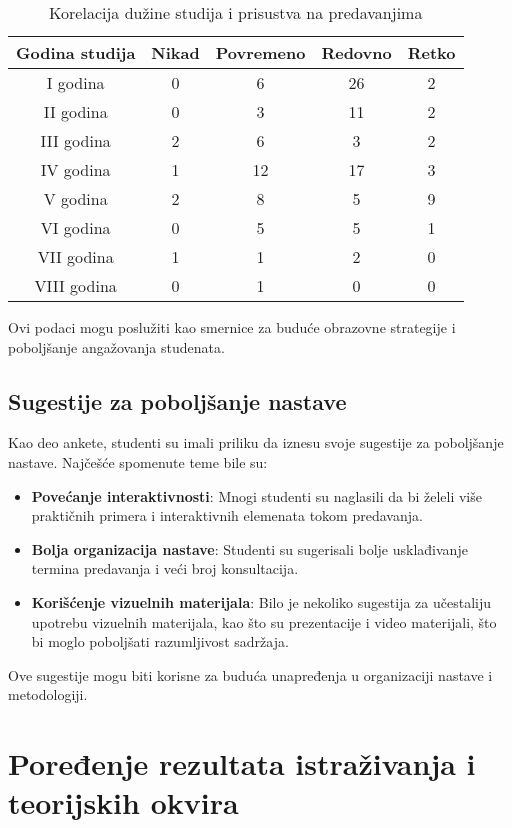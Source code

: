 \documentclass{article}
\begin{document}
\begin{table}[h!]
\centering
\begin{tabular}{|c|c|c|c|c|}
\hline
\textbf{Godina studija} & \textbf{Nikad} & \textbf{Povremeno} & \textbf{Redovno} & \textbf{Retko} \\ \hline
I godina & 0 & 6 & 26 & 2 \\ \hline
II godina & 0 & 3 & 11 & 2 \\ \hline
III godina & 2 & 6 & 3 & 2 \\ \hline
IV godina & 1 & 12 & 17 & 3 \\ \hline
V godina & 2 & 8 & 5 & 9 \\ \hline
VI godina & 0 & 5 & 5 & 1 \\ \hline
VII godina & 1 & 1 & 2 & 0 \\ \hline
VIII godina & 0 & 1 & 0 & 0 \\ \hline
\end{tabular}
\caption{Korelacija dužine studija i prisustva na predavanjima}
\label{tab:korelacija_studiji_prisustvo}
\end{table}
Ovi podaci mogu poslužiti kao smernice za buduće obrazovne strategije i poboljšanje angažovanja studenata.

\subsection{Sugestije za poboljšanje nastave}
Kao deo ankete, studenti su imali priliku da iznesu svoje sugestije za poboljšanje nastave. Najčešće spomenute teme bile su:
\begin{itemize}
    \item \textbf{Povećanje interaktivnosti}: Mnogi studenti su naglasili da bi želeli više praktičnih primera i interaktivnih elemenata tokom predavanja.
    \item \textbf{Bolja organizacija nastave}: Studenti su sugerisali bolje usklađivanje termina predavanja i veći broj konsultacija.
    \item \textbf{Korišćenje vizuelnih materijala}: Bilo je nekoliko sugestija za učestaliju upotrebu vizuelnih materijala, kao što su prezentacije i video materijali, što bi moglo poboljšati razumljivost sadržaja.
\end{itemize}
Ove sugestije mogu biti korisne za buduća unapređenja u organizaciji nastave i metodologiji.



\section{Poređenje rezultata istraživanja i teorijskih okvira}
\end{document}
